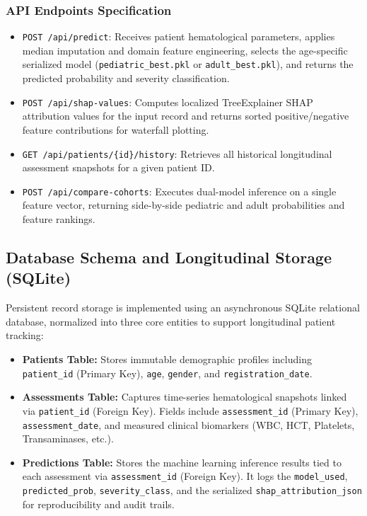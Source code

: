 \documentclass[12pt, a4paper]{report}
\begin{document}
\subsubsection{API Endpoints Specification}
\begin{itemize}
    \item \texttt{POST /api/predict}: Receives patient hematological parameters, applies median imputation and domain feature engineering, selects the age-specific serialized model (\texttt{pediatric\_best.pkl} or \texttt{adult\_best.pkl}), and returns the predicted probability and severity classification.
    \item \texttt{POST /api/shap-values}: Computes localized TreeExplainer SHAP attribution values for the input record and returns sorted positive/negative feature contributions for waterfall plotting.
    \item \texttt{GET /api/patients/\{id\}/history}: Retrieves all historical longitudinal assessment snapshots for a given patient ID.
    \item \texttt{POST /api/compare-cohorts}: Executes dual-model inference on a single feature vector, returning side-by-side pediatric and adult probabilities and feature rankings.
\end{itemize}

\subsection{Database Schema and Longitudinal Storage (SQLite)}
Persistent record storage is implemented using an asynchronous SQLite relational database, normalized into three core entities to support longitudinal patient tracking:
\begin{itemize}
    \item \textbf{Patients Table:} Stores immutable demographic profiles including \texttt{patient\_id} (Primary Key), \texttt{age}, \texttt{gender}, and \texttt{registration\_date}.
    \item \textbf{Assessments Table:} Captures time-series hematological snapshots linked via \texttt{patient\_id} (Foreign Key). Fields include \texttt{assessment\_id} (Primary Key), \texttt{assessment\_date}, and measured clinical biomarkers (WBC, HCT, Platelets, Transaminases, etc.).
    \item \textbf{Predictions Table:} Stores the machine learning inference results tied to each assessment via \texttt{assessment\_id} (Foreign Key). It logs the \texttt{model\_used}, \texttt{predicted\_prob}, \texttt{severity\_class}, and the serialized \texttt{shap\_attribution\_json} for reproducibility and audit trails.
\end{itemize}
\end{document}

